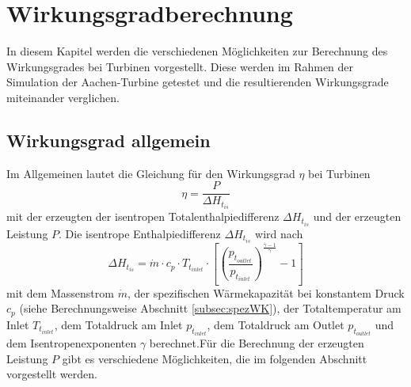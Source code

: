 \chapter{Wirkungsgradberechnung}
\label{cha:wgberechnung}
In diesem Kapitel werden die verschiedenen Möglichkeiten zur Berechnung des Wirkungsgrades bei Turbinen vorgestellt. Diese werden im Rahmen der Simulation der Aachen-Turbine getestet und die resultierenden Wirkungsgrade miteinander verglichen.
\section{Wirkungsgrad allgemein}
Im Allgemeinen lautet die Gleichung für den Wirkungsgrad $\eta$ bei Turbinen 
\begin{equation}
\label{eq:wgallgemein}
\eta =\frac{P}{\Delta H_{t_{is}}}
\end{equation}
mit der erzeugten der isentropen Totalenthalpiedifferenz $\Delta H_{t_{is}}$ und der erzeugten Leistung $P$.
Die isentrope Enthalpiedifferenz $\Delta H_{t_{is}}$ wird nach
\begin{equation}
\label{eq:wgnenner}
\Delta H_{t_{is}} = \dot m \cdot c_p \cdot T_{t_{inlet}} \cdot \left[ \left( \frac{p_{t_{outlet}}}{p_{t_{inlet}}}\right)^\frac{\gamma-1}{\gamma}-1\right]
\end{equation}
mit dem Massenstrom $\dot m$, der spezifischen Wärmekapazität bei konstantem Druck $c_p$ (siehe Berechnungsweise Abschnitt \ref{subsec:spezWK}), der Totaltemperatur am Inlet $T_{t_{inlet}}$, dem Totaldruck am Inlet $p_{t_{inlet}}$, dem Totaldruck am Outlet $p_{t_{outlet}}$ und dem Isentropenexponenten $\gamma$ berechnet.\newline Für die Berechnung der erzeugten Leistung $P$ gibt es verschiedene Möglichkeiten, die im folgenden Abschnitt vorgestellt werden.
